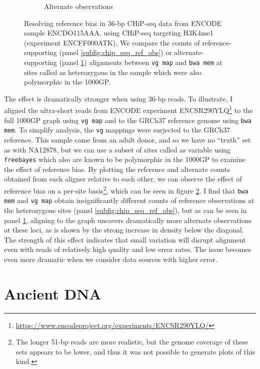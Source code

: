 \begin{figure}[htbp!]
\begin{subfigure}[t]{0.49\textwidth}
    \caption{Alternate observations}
    \label{subfig:chip_seq_alt_obs}
  \end{subfigure}
  \caption[Resolving reference bias in 36-bp CHiP-seq]{
    Resolving reference bias in 36-bp CHiP-seq data from ENCODE sample ENCDO115AAA, using CHiP-seq targeting H3K4me1 (experiment ENCFF000ATK).
    We compare the counts of reference-supporting (panel \ref{subfig:chip_seq_ref_obs}) or alternate-supporting (panel \ref{subfig:chip_seq_alt_obs}) alignments between {\tt vg map} and {\tt bwa mem} at sites called as heterozygous in the sample which were also polymorphic in the 1000GP.
   }
\label{fig:chip_seq}
\end{figure}

The effect is dramatically stronger when using 36-bp reads.
To illustrate, I aligned the ultra-short reads from ENCODE experiment ENCSR290YLQ\footnote{\url{https://www.encodeproject.org/experiments/ENCSR290YLQ/}} to the full 1000GP graph using {\tt vg map} and to the GRCh37 reference genome using {\tt bwa mem}.
To simplify analysis, the {\tt vg} mappings were surjected to the GRCh37 reference.
This sample came from an adult donor, and so we have no ``truth'' set as with NA12878, but we can use a subset of sites called as variable using {\tt freebayes} which also are known to be polymorphic in the 1000GP to examine the effect of reference bias.
By plotting the reference and alternate counts obtained from each aligner relative to each other, we can observe the effect of reference bias on a per-site basis\footnote{The longer 51-bp reads are more realistic, but the genome coverage of these sets appears to be lower, and thus it was not possible to generate plots of this kind.}, which can be seen in figure \ref{fig:chip_seq}.
I find that {\tt bwa mem} and {\tt vg map} obtain insignificantly different counts of reference observations at the heterozygous sites (panel \ref{subfig:chip_seq_ref_obs}), but as can be seen in panel \ref{subfig:chip_seq_alt_obs}, aligning to the graph uncovers dramatically more alternate observations at these loci, as is shown by the strong increase in density below the diagonal.
The strength of this effect indicates that small variation will disrupt alignment even with reads of relatively high quality and low error rates.
The issue becomes even more dramatic when we consider data sources with higher error.

\section{Ancient DNA}

